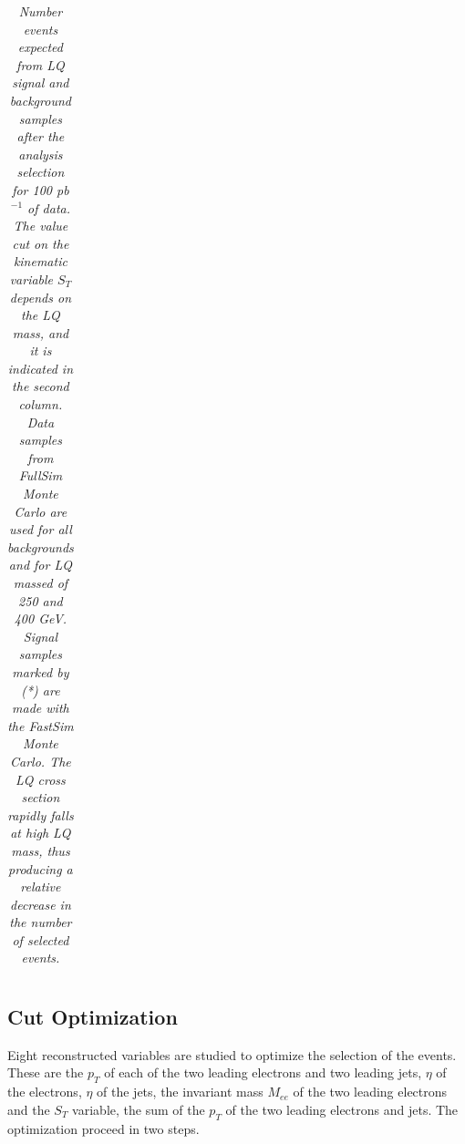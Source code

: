 \begin{table}[htbp]
\begin{center}
\begin{tabular}{|ccc||cccc|}
\hline\hline
\end{tabular}
\end{center}
\caption{\small \sl Number events expected from LQ signal and background samples after the analysis selection for 100 pb$^{-1}$ of data.
The value cut on the kinematic variable $S_T$ depends on the LQ mass, and it is indicated in the second column.
Data samples from FullSim Monte Carlo are used for all backgrounds and for LQ massed of 250 and 400 GeV. Signal samples marked by (*) are
made with the FastSim Monte Carlo.
The LQ cross section rapidly falls at high LQ mass, thus producing a relative decrease in the number of selected events. } 
\label{tab:EventSelSummary}
\end{table}


\clearpage

\subsection{Cut Optimization} \label{sec:cutOptimization}

Eight reconstructed variables are studied to optimize the selection of the events.
These are the $p_T$ of each of the two leading electrons and two leading jets, $\eta$
of the electrons, $\eta$ of the jets, the invariant mass $M_{ee}$ of the two leading electrons 
and the $S_T$ variable, the sum of the $p_T$ of the two leading electrons and jets.
The optimization proceed in two steps. 

